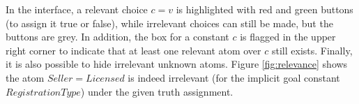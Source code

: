 

In the interface, a relevant choice $c=v$ is highlighted with red and green buttons (to assign it true or false), while irrelevant choices can still be made, but the buttons are grey. In addition, the box for a constant $c$ is flagged in the upper right corner to indicate that at least one relevant atom over $c$ still exists. Finally, it is also possible to hide irrelevant unknown atoms. %
Figure \ref{fig:relevance} shows the atom $Seller=Licensed$ is indeed irrelevant (for the implicit goal constant $RegistrationType$) under the given truth assignment.



